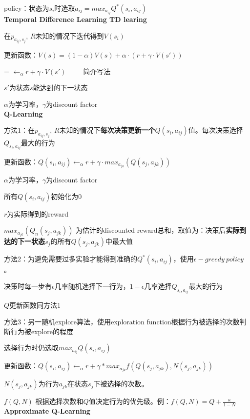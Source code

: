 \documentclass[UTF8]{ctexart}
\begin{document}
  policy：状态为$s_i$时选取$a_{ij} = max_{a_{ij}} Q^*(s_i, a_{ij})$\\
\textbf{Temporal Difference Learning TD learing}

  在$p_{a_{ij}, s_j}$, $R$未知的情况下迭代得到$V(s_i)$
  
  更新函数：$V(s) = (1-\alpha)V(s) + \alpha \cdot (r + \gamma \cdot V(s'))$
  
  \quad = $\leftarrow_{\alpha} r + \gamma \cdot V(s') $\ \ \ \ \ 简介写法
  
  \quad $s'$为状态$s$能达到的下一状态
  
  \quad $\alpha$为学习率，$\gamma$为discount factor\\
\textbf{Q-Learning}

  方法1：在$p_{a_{ij}, s_j}$, $R$未知的情况下\textbf{每次决策更新一个}$Q(s_i, a_{ij})$值。每次决策选择$Q_{s_i, a_{ij}}$最大的行为

  \quad 更新函数：$Q(s_i, a_{ij}) \leftarrow_{\alpha} r + \gamma \cdot max_{a_{jk}} (Q(s_j, a_{jk}))$

  \quad \quad $\alpha$为学习率，$\gamma$为discount factor

  \quad \quad 所有$Q(s_i, a_{ij})$初始化为0
  
  \quad \quad $r$为实际得到的reward

  \quad \quad $max_{a_{jk}} (Q_{n}(s_j, a_{jk}))$ 为估计的discounted reward总和，取值为：决策后\textbf{实际到达的下一状态}$s_j$的所有$Q(s_j, a_{jk})$中最大值

  方法2：为避免需要过多实验才能得到准确的$Q^*(s_i, a_{ij})$，使用$\epsilon-greedy\ policy$。
  
  \quad 决策时每一步有$\epsilon$几率随机选择下一行为，$1-\epsilon$几率选择$Q_{s_i, a_{ij}}$最大的行为

  \quad $Q$更新函数同方法1
  
  方法3：另一随机explore算法，使用exploration function根据行为被选择的次数判断行为被explore的程度
  
  \quad 选择行为时仍选取$max_{a_{ij}} Q(s_i, a_{ij})$
  
  \quad 更新函数：$Q(s_i, a_{ij}) \leftarrow_{\alpha} r + \gamma * max_{a_{jk}} f(Q(s_j, a_{jk}), N(s_j, a_{jk}))$
  
  \quad \quad $N(s_j, a_{jk})$为行为$a_{jk}$在状态$s_j$下被选择的次数。
  
  \quad \quad $f(Q, N)$ 根据选择次数和$Q$值决定行为的优先级。例：$f(Q, N) = Q + \frac{\kappa}{1 - N} $\\
\textbf{Approximate Q-Learning}
\end{document}

